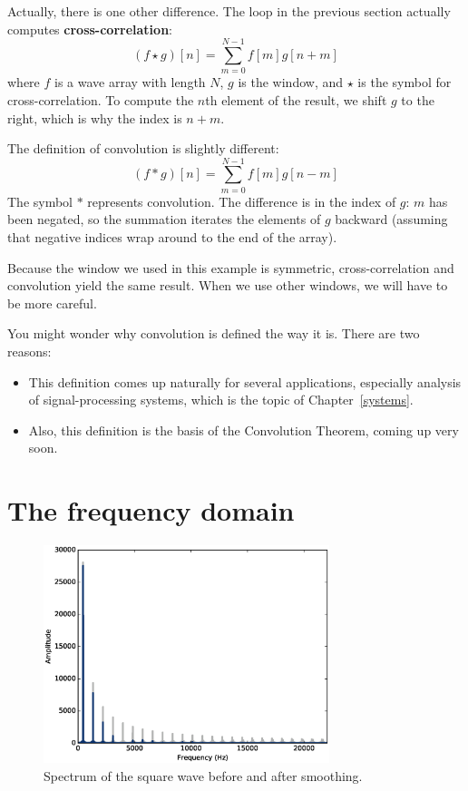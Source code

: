 \documentclass[12pt]{book}
\begin{document}
\newcommand{\conv}{\ast}

Actually, there is one other difference.  The loop in the
previous section actually computes {\bf cross-correlation}:
%
\[ (f \star g)[n] = \sum_{m=0}^{N-1} f[m] g[n+m]  \]
%
where $f$ is a wave array with length $N$, $g$ is the window,
and $\star$ is the symbol for cross-correlation.  To
compute the $n$th element of the result, we shift $g$ to
the right, which is why the index is $n+m$.

The definition of convolution is slightly different:
%
\[ (f \conv g)[n] = \sum_{m=0}^{N-1} f[m] g[n-m]  \]
%
The symbol $\conv$ represents convolution.  The difference is in the
index of $g$: $m$ has been negated, so the summation iterates the
elements of $g$ backward (assuming that negative indices wrap around
to the end of the array).

Because the window we used in this example is symmetric,
cross-correlation and convolution yield the same result.  When we use
other windows, we will have to be more careful.

You might wonder why convolution is defined the way it is.  There
are two reasons:

\begin{itemize}

\item This definition comes up naturally for several applications,
especially analysis of signal-processing systems, which is
the topic of Chapter~\ref{systems}.

\item Also, this definition is the basis of the Convolution Theorem,
coming up very soon.

\end{itemize}


\section{The frequency domain}

\begin{figure}
\centerline{\includegraphics[height=2.5in]{figs/convolution4.eps}}
\caption{Spectrum of the square wave before and after smoothing.}
\label{fig.convolution4}
\end{figure}
\end{document}
